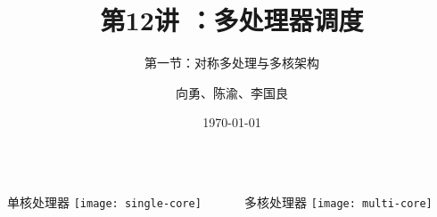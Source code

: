 


\title[第1讲]{第12讲 ：多处理器调度} %
\subtitle{第一节：对称多处理与多核架构}
\author{向勇、陈渝、李国良} %
\date{\today} %




\begin{frame}
\titlepage %
\end{frame}

%
%

\begin{frame}
	\begin{columns}
	\begin{column}{.5\textwidth}
	\Large
	单核处理器	
    \texttt{[image: single-core]}
		
	\end{column}
	
	\begin{column}{.5\textwidth}
			\Large
		多核处理器
		\texttt{[image: multi-core]}
		
	\end{column}
\end{columns}
\end{frame}

